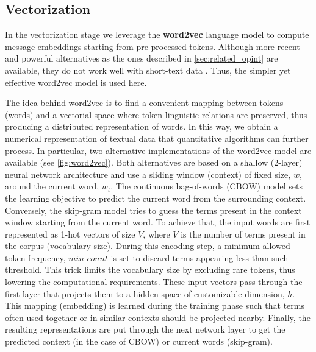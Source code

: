 \subsection{Vectorization} \label{sec:vectorization}

In the vectorization stage we leverage the \textbf{word2vec} language model \cite{mikolov2013word2vec} to compute message embeddings starting from pre-processed tokens.
Although more recent and powerful alternatives as the ones described in \cref{sec:related_opint} are available, they do not work well with short-text data \cite{albalawi2020short-text}. Thus, the simpler yet effective word2vec model is used here.

The idea behind word2vec is to find a convenient mapping between tokens (words) and a vectorial space where token linguistic relations are preserved, thus producing a distributed representation of words.
In this way, we obtain a numerical representation of textual data that quantitative algorithms can further process.
In particular, two alternative implementations of the word2vec model are available (see \cref{fig:word2vec}).
Both alternatives are based on a shallow (2-layer) neural network architecture and use a sliding window (context) of fixed size, $w$, around the current word, $w_t$.
The continuous bag-of-words (CBOW) model sets the learning objective to predict the current word from the surrounding context.
Conversely, the \mbox{skip-gram} model tries to guess the terms present in the context window starting from the current word.
To achieve that, the input words are first represented as 1-hot vectors of size $V$, where $V$ is the number of terms present in the corpus (vocabulary size). 
During this encoding step, a minimum allowed token frequency, $min\_count$ is set to discard terms appearing less than such threshold. This trick limits the vocabulary size by excluding rare tokens, thus lowering the computational requirements.
These input vectors pass through the first layer that projects them to a hidden space of customizable dimension, $h$. This mapping (embedding) is learned during the training phase such that terms often used together or in similar contexts should be projected nearby.
Finally, the resulting representations are put through the next network layer to get the predicted context (in the case of CBOW) or current words (skip-gram).

